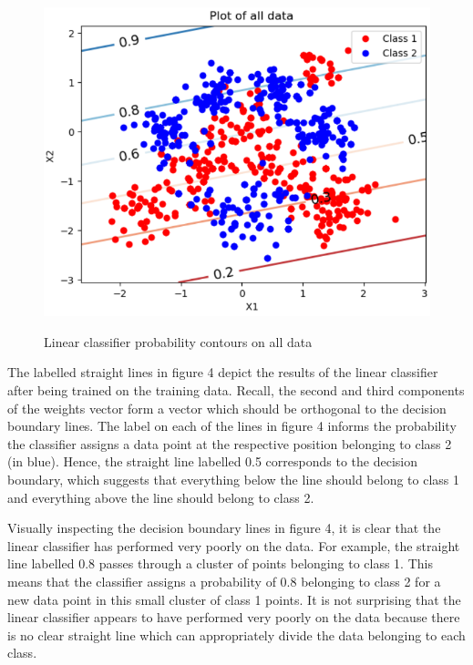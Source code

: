 \documentclass[twocolumn]{article}
\begin{document}
\begin{figure}[!htb]
	\centering\includegraphics[width=\columnwidth]{d}\\
	\caption{Linear classifier probability contours on all data}\label{triang}
\end{figure}

The labelled straight lines in figure 4 depict the results of the linear classifier after being trained on the training data. Recall, the second and third components of the weights vector form a vector which should be orthogonal to the decision boundary lines. The label on each of the lines in figure 4 informs the probability the classifier assigns a data point at the respective position belonging to class 2 (in blue). Hence, the straight line labelled 0.5 corresponds to the decision boundary, which suggests that everything below the line should belong to class 1 and everything above the line should belong to class 2.

Visually inspecting the decision boundary lines in figure 4, it is clear that the linear classifier has performed very poorly on the data. For example, the straight line labelled 0.8 passes through a cluster of points belonging to class 1. This means that the classifier assigns a probability of 0.8 belonging to class 2 for a new data point in this small cluster of class 1 points. It is not surprising that the linear classifier appears to have performed very poorly on the data because there is no clear straight line which can appropriately divide the data belonging to each class. 
\end{document}

